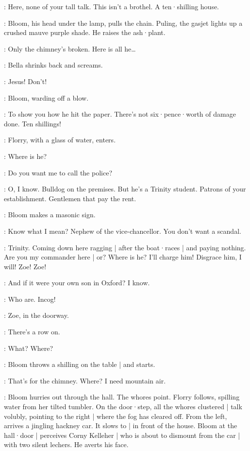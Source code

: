 \Bella:
Here,
none of your tall talk.
This isn't a brothel.
A ten·shilling house.

:
Bloom,
his head under the lamp,
pulls the chain.
Puling,
the gasjet lights up a crushed mauve purple shade.
He raises the ash·plant.

\Bloom:
Only the chimney's broken.
Here is all he…

:
Bella shrinks back and screams.

\Bella:
Jesus!
Don't!

:
Bloom,
warding off a blow.

\Bloom:
To show you how he hit the paper.
%
There's not six·pence·worth of damage done.
Ten shillings!

:
Florry,
with a glass of water,
enters.

\Florry:
Where is he?

\Bella:
Do you want me to call the police?

\Bloom:
O,
I know.
Bulldog on the premises.
But he's a Trinity student.
Patrons of your establishment.
Gentlemen that pay the rent.

:
Bloom makes a masonic sign.

\Bloom:
Know what I mean?
Nephew of the vice-chancellor.
You don't want a scandal.%

\Bella:
Trinity.
Coming down here ragging |
after the boat·races |
and paying nothing.
Are you my commander here |
or?
Where is he?
I'll charge him!
Disgrace him,
I will!
Zoe!
Zoe!

\Bloom:
And if it were your own son in Oxford?
I know.

\Bella:
Who are.
Incog!

:
Zoe,
in the doorway.

\Zoe:
There's a row on.

\Bloom:
What?
Where?

:
Bloom throws a shilling on the table |
and starts.

\Bloom:
That's for the chimney.
Where?
I need mountain air.

:
Bloom hurries out through the hall.
The whores point.
Florry follows,
spilling water from her tilted tumbler.
On the door·step,
all the whores clustered |
talk volubly,
pointing to the right |
where the fog has cleared off.
From the left,
arrives a jingling hackney car.
It slows to |
in front of the house.
Bloom at the hall·door |
perceives Corny Kelleher |
who is about to dismount from the car |
with two silent lechers.
%
He averts his face.

